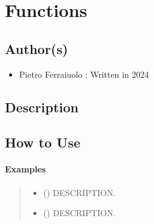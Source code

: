 \documentclass[letterpaper,10pt,english]{sphinxmanual}
\begin{document}
\sphinxstepscope


\chapter{Functions}
\label{\detokenize{functions:module-ggcas.functions}}\label{\detokenize{functions:functions}}\label{\detokenize{functions::doc}}

\section{Author(s)}
\label{\detokenize{functions:author-s}}\begin{itemize}
\item {} 
\sphinxAtStartPar
Pietro Ferraiuolo : Written in 2024

\end{itemize}


\section{Description}
\label{\detokenize{functions:description}}

\section{How to Use}
\label{\detokenize{functions:how-to-use}}\subsubsection*{Examples}

\begin{fulllineitems}
\label{\detokenize{functions:ggcas.functions.angular_separation}}
\pysigstartsignatures
{}
\pysigstopsignatures\begin{quote}\begin{description}
\sphinxAtStartPar
\begin{itemize}
\item {} 
\sphinxAtStartPar
{} () \textendash{} DESCRIPTION.

\item {} 
\sphinxAtStartPar
{} () \textendash{} DESCRIPTION.

\end{itemize}


\end{description}\end{quote}

\end{fulllineitems}
\end{document}
